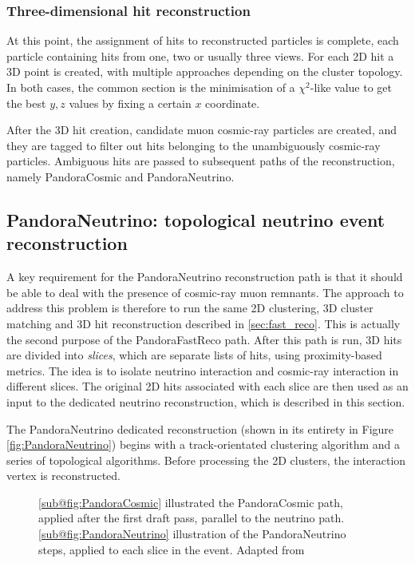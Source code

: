 \subsubsection{Three-dimensional hit reconstruction}

At this point, the assignment of hits to reconstructed particles is complete, each particle containing hits from one, two or usually three views. For each 2D hit a 3D point is created, with multiple approaches depending on the cluster topology. In both cases, the common section is the minimisation of a $\chi^2$-like value to get the best $y,z$ values by fixing a certain $x$ coordinate. 

After the 3D hit creation, candidate muon cosmic-ray particles are created, and they are tagged to filter out hits belonging to the unambiguously cosmic-ray particles. Ambiguous hits are passed to subsequent paths of the reconstruction, namely PandoraCosmic and PandoraNeutrino. 

\subsection{PandoraNeutrino: topological neutrino event reconstruction} 

A key requirement for the PandoraNeutrino reconstruction path is that it should be able to deal with the presence of cosmic-ray muon remnants. The approach to address this problem is therefore to run the same 2D clustering, 3D cluster matching and 3D hit reconstruction described in \autoref{sec:fast_reco}. This is actually the second purpose of the PandoraFastReco path. After this path is run, 3D hits are divided into \emph{slices}, which are separate lists of hits, using proximity-based metrics. The idea is to isolate neutrino interaction and cosmic-ray interaction in different slices. The original 2D hits associated with each slice are then used as an input to the dedicated neutrino reconstruction, which is described in this section. 

The PandoraNeutrino dedicated reconstruction (shown in its entirety in Figure \ref{fig:PandoraNeutrino}) begins with a track-orientated clustering algorithm and a series of topological algorithms. Before processing the 2D clusters, the interaction vertex is reconstructed. 

\begin{figure}
    \centering
    \caption[PandoraCosmic and PandoraNeutrino paths illustration]{\ref{sub@fig:PandoraCosmic} illustrated the PandoraCosmic path, applied after the first draft pass, parallel to the neutrino path. \ref{sub@fig:PandoraNeutrino} illustration of the PandoraNeutrino steps, applied to each slice in the event. Adapted from \cite{MicroBooNE:2017xvs}}
    \label{fig:PandoraCosmicNeutrino}
\end{figure}

